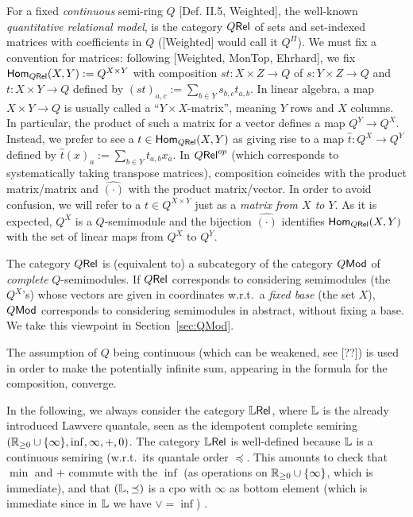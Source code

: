 For a fixed \emph{continuous} semi-ring $Q$ [Def. II.5, Weighted], the well-known \emph{quantitative relational model}, is the category $Q \mathsf{Rel}$ of sets and set-indexed matrices with coefficients in $Q$ ([Weighted] would call it $Q^\Pi$).
We must fix a convention for matrices: following [Weighted, MonTop, Ehrhard], we fix $\mathsf{Hom}_{Q \mathsf{Rel}}(X,Y):=Q^{X\times Y}$ with composition $st:X\times Z\to Q$ of $s:Y\times Z\to Q$ and $t:X\times Y\to Q$ defined by $(st)_{a,c}:=\sum\limits_{b\in Y} s_{b,c}t_{a,b}$.
In linear algebra, a map $X\times Y\to Q$ is usually called a ``$Y\times X$-matrix'', meaning $Y$ rows and $X$ columns.
In particular, the product of such a matrix for a vector defines a map $Q^Y\to Q^X$.
Instead, we prefer to see a $t\in\mathsf{Hom}_{Q \mathsf{Rel}}(X,Y)$ as giving rise to a map $\hat t:Q^X\to Q^Y$ defined by $\hat t(x)_a:=\sum\limits_{b\in Y} t_{a,b}x_a$.
In $Q \mathsf{Rel}^{op}$ (which corresponds to systematically taking transpose matrices), composition coincides with the product matrix/matrix and $\hat{(\cdot)}$ with the product matrix/vector.
In order to avoid confusion, we will refer to a $t\in Q^{X\times Y}$ just as a \emph{matrix from $X$ to $Y$}.
As it is expected, $Q^X$ is a $Q$-semimodule and the bijection $\hat{(\cdot)}$ identifies $\mathsf{Hom}_{Q \mathsf{Rel}}(X,Y)$ with the set of linear maps from $Q^X$ to $Q^Y$.

\begin{remark}
 The category $Q \mathsf{Rel}$ is (equivalent to) a subcategory of the category $Q\mathsf{Mod}$ of \emph{complete} $Q$-semimodules.
 If $Q \mathsf{Rel}$ corresponds to considering semimodules (the $Q^X$'s) whose vectors are given in coordinates w.r.t.\ a \emph{fixed base} (the set $X$), $Q\mathsf{Mod}$ corresponds to considering semimodules in abstract, without fixing a base.
 We take this viewpoint in Section~\ref{sec:QMod}.
\end{remark}

The assumption of $Q$ being continuous (which can be weakened, see [??]) is used in order to make the potentially infinite sum, appearing in the formula for the composition, converge.

In the following, we always consider the category $\mathbb{L} \mathsf{Rel}$, where $\mathbb{L}$ is the already introduced Lawvere quantale, seen as the idempotent complete semiring $(\mathbb{R}_{\geq0}\cup\{\infty\},\inf,\infty,+,0)$.
The category $\mathbb{L} \mathsf{Rel}$ is well-defined because $\mathbb{L}$ is a continuous semiring (w.r.t.\ its quantale order $\preceq$.
This amounts to check that $\min$ and $+$ commute with the $\inf$ (as operations on $\mathbb{R}_{\geq0}\cup\{\infty\}$, which is immediate), and that $(\mathbb{L},\preceq)$ is a cpo with $\infty$ as bottom element (which is immediate since in $\mathbb{L}$ we have $\vee = \inf$) .

